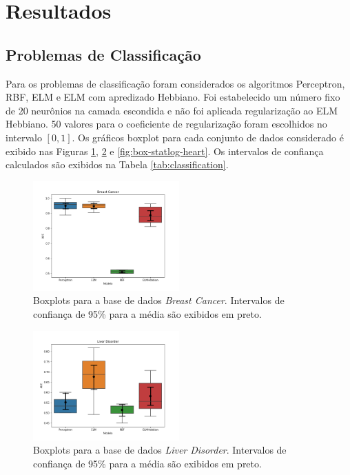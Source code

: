 \documentclass[conference]{IEEEtran}
\begin{document}
	
	\section{Resultados}
	
	\subsection{Problemas de Classificação}
	Para os problemas de classificação foram considerados os algoritmos Perceptron, RBF, ELM e ELM com apredizado Hebbiano. Foi estabelecido um número fixo de 20 neurônios na camada escondida e não foi aplicada regularização ao ELM Hebbiano. 50 valores para o coeficiente de regularização foram escolhidos no intervalo $[0,1]$. Os gráficos boxplot para cada conjunto de dados considerado é exibido nas Figuras \ref{fig:box-Breast Cancer}, \ref{fig:box-Liver-Disorder} e \ref{fig:box-statlog-heart}. Os intervalos de confiança calculados são exibidos na Tabela \ref{tab:classification}.
	
	\begin{figure}[thpbh]
		\centering
		\includegraphics[width=0.5\textwidth]{figures/Breast Cancer_scores.png}
		\caption{Boxplots para a base de dados \textit{Breast Cancer}. Intervalos de confiança de 95\% para a média são exibidos em preto.}
		\label{fig:box-Breast Cancer}
	\end{figure}
	
		\begin{figure}[thpbh]
		\centering
		\includegraphics[width=0.5\textwidth]{figures/Liver Disorder_scores.png}
		\caption{Boxplots para a base de dados \textit{Liver Disorder}. Intervalos de confiança de 95\% para a média são exibidos em preto.}
		\label{fig:box-Liver-Disorder}
	\end{figure}	
	
\end{document}
